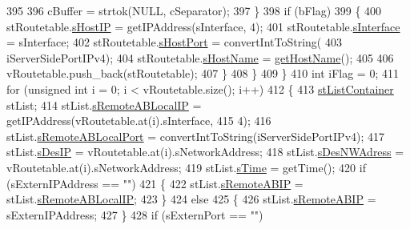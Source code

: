 \begin{DoxyCode}
395 
396                     cBuffer = strtok(NULL, cSeparator);
397                 \}
398                 \textcolor{keywordflow}{if} (bFlag)
399                 \{
400                     stRoutetable.\hyperlink{structstRoutetable_a5cdcd38c1c8a9fd2bb7a34b5550a5f8c}{sHostIP} = getIPAddress(sInterface, 4);
401                     stRoutetable.\hyperlink{structstRoutetable_a02604c87af267a30c992c3c8f8e8366a}{sInterface} = sInterface;
402                     stRoutetable.\hyperlink{structstRoutetable_a48bafcc14c088a68e976dd9a260dd6dd}{sHostPort} = convertIntToString(
403                             iServerSidePortIPv4);
404                     stRoutetable.\hyperlink{structstRoutetable_a7e4e8ff4c0d99dde9f168795056ae06c}{sHostName} = \hyperlink{classLocalNetworkInformation_a63cf18e0d7cdc14426e4999ef397c981}{getHostName}();
405 
406                     vRoutetable.push\_back(stRoutetable);
407                 \}
408             \}
409         \}
410         \textcolor{keywordtype}{int} iFlag = 0;
411         \textcolor{keywordflow}{for} (\textcolor{keywordtype}{unsigned} \textcolor{keywordtype}{int} i = 0; i < vRoutetable.size(); i++)
412         \{
413             \hyperlink{structstListContainer}{stListContainer} stList;
414             stList.\hyperlink{structstListContainer_a661224bc268bac73ea4c4f179626f04b}{sRemoteABLocalIP} = getIPAddress(vRoutetable.at(i).sInterface,
415                     4);
416             stList.\hyperlink{structstListContainer_aeadf64994288c18847cb1b9fc244922f}{sRemoteABLocalPort} = convertIntToString(iServerSidePortIPv4);
417             stList.\hyperlink{structstListContainer_ab4fde5a0381565943612e2e672b02513}{sDesIP} = vRoutetable.at(i).sNetworkAddress;
418             stList.\hyperlink{structstListContainer_ae886a76fb72d96cbc124544538905ef8}{sDesNWAdress} = vRoutetable.at(i).sNetworkAddress;
419             stList.\hyperlink{structstListContainer_acec007ec5b8190c8bf0242980b0b7528}{sTime} = getTime();
420             \textcolor{keywordflow}{if} (sExternIPAddress == \textcolor{stringliteral}{""})
421             \{
422                 stList.\hyperlink{structstListContainer_a2d926770549c1af0e1282f20cdc241e5}{sRemoteABIP} = stList.\hyperlink{structstListContainer_a661224bc268bac73ea4c4f179626f04b}{sRemoteABLocalIP};
423             \}
424             \textcolor{keywordflow}{else}
425             \{
426                 stList.\hyperlink{structstListContainer_a2d926770549c1af0e1282f20cdc241e5}{sRemoteABIP} = sExternIPAddress;
427             \}
428             \textcolor{keywordflow}{if} (sExternPort == \textcolor{stringliteral}{""})

\end{DoxyCode}
